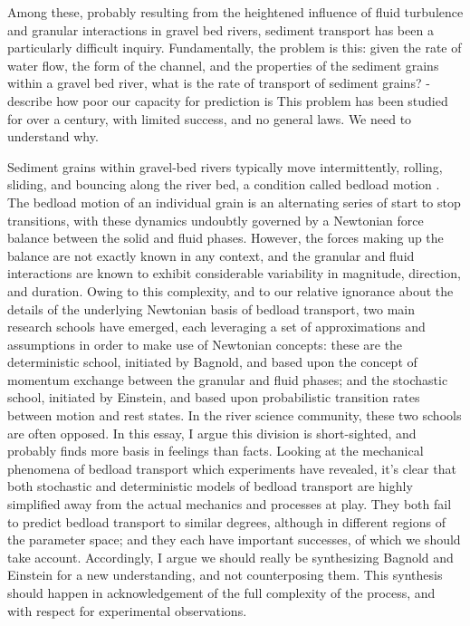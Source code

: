 \documentclass{article}
\begin{document}
 
Among these, probably resulting from the heightened influence of fluid turbulence and granular interactions in gravel bed rivers, sediment transport has been a particularly difficult inquiry. 
Fundamentally, the problem is this: given the rate of water flow, the form of the channel, and the properties of the sediment grains within a gravel bed river, what is the rate of transport of sediment grains?
- describe how poor our capacity for prediction is 
This problem has been studied for over a century, with limited success, and no general laws. 
We need to understand why.  

Sediment grains within gravel-bed rivers typically move intermittently, rolling, sliding, and bouncing along the river bed, a condition called bedload motion \citep{Einstein1950}.
The bedload motion of an individual grain is an alternating series of start to stop transitions, with these dynamics undoubtly governed by a Newtonian force balance between the solid and fluid phases.
However, the forces making up the balance are not exactly known in any context, and the granular \citep{Lamb2008} and fluid \citep{Schmeeckle2007, Celik2014, Amir2014, Shih2017} interactions are known to exhibit considerable variability in magnitude, direction, and duration. 
Owing to this complexity, and to our relative ignorance about the details of the underlying Newtonian basis of bedload transport, two main research schools have emerged, each leveraging a set of approximations and assumptions in order to make use of Newtonian concepts: these are the deterministic school, initiated by Bagnold, and based upon the concept of momentum exchange between the granular and fluid phases; and the stochastic school, initiated by Einstein, and based upon probabilistic transition rates between motion and rest states. 
In the river science community, these two schools are often opposed. 
In this essay, I argue this division is short-sighted, and probably finds more basis in feelings than facts.
Looking at the mechanical phenomena of bedload transport which experiments have revealed, it's clear that both stochastic and deterministic models of bedload transport are highly simplified away from the actual mechanics and processes at play.  
They both fail to predict bedload transport to similar degrees, although in different regions of the parameter space; and they each have important successes, of which we should take account. 
Accordingly, I argue we should really be synthesizing Bagnold and Einstein for a new understanding, and not counterposing them. 
This synthesis should happen in acknowledgement of the full complexity of the process, and with respect for experimental observations. 
\end{document}
